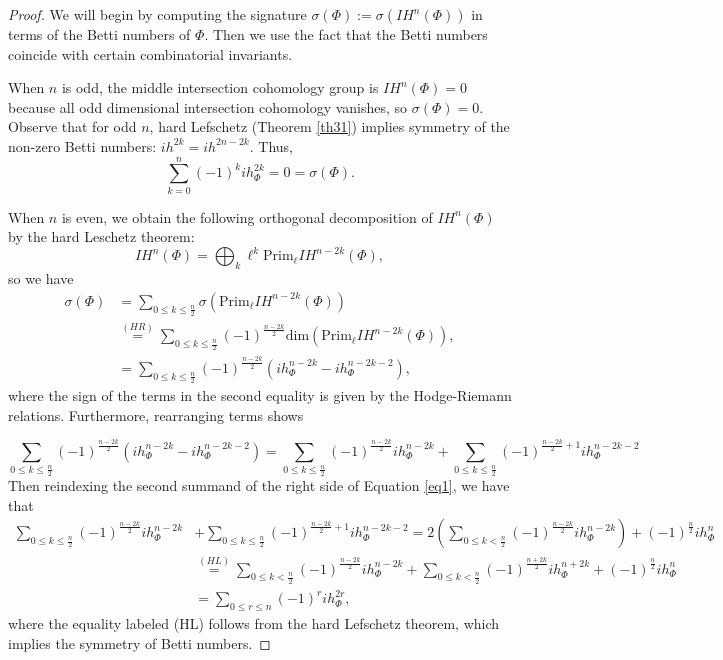 \documentclass[10pt,a4paper]{amsart}
\begin{document}
\begin{proof} We will begin by computing the signature $\sigma(\Phi):=\sigma(IH^n(\Phi))$ in terms of the Betti numbers of $\Phi$. Then we use the fact that the Betti numbers coincide with certain combinatorial invariants.

When $n$ is odd, the middle intersection cohomology group is $IH^n(\Phi)=0$ because all odd dimensional intersection cohomology vanishes, so $\sigma(\Phi)=0$. Observe that for odd $n$, hard Lefschetz (Theorem \ref{th31}) implies symmetry of the non-zero Betti numbers: $ih^{2k}=ih^{2n-2k}$. Thus, 
\begin{equation}\sum_{k=0}^n (-1)^kih_{\Phi}^{2k}=0=\sigma(\Phi).
\end{equation}

When $n$ is even, we obtain the following orthogonal decomposition of $IH^n(\Phi)$ by the hard Leschetz theorem:
\begin{equation}
   IH^n(\Phi)=\bigoplus_k \ell^{k}\text{Prim}_\ell IH^{n-2k}(\Phi), 
\end{equation}
so we have
\begin{equation}
\begin{split}
    \sigma(\Phi)&=\sum_{0\leq k\leq \frac{n}{2}}\sigma(\text{Prim}_\ell IH^{n-2k}(\Phi)) \\
   & \overset{(HR)}{=}\sum_{0\leq k\leq \frac{n}{2}}(-1)^\frac{n-2k}{2}\text{dim}(\text{Prim}_\ell IH^{n-2k}(\Phi)),\\
&=\sum_{0\leq k\leq \frac{n}{2}}(-1)^\frac{n-2k}{2}(ih_\Phi^{n-2k}-ih_\Phi^{n-2k-2}),
\end{split}
\end{equation}
where the sign of the terms in the second equality is given by the Hodge-Riemann relations. Furthermore, rearranging terms shows 

\begin{equation}\label{eq1}
    \sum_{0\leq k\leq \frac{n}{2}}(-1)^\frac{n-2k}{2}(ih_\Phi^{n-2k}-ih_\Phi^{n-2k-2})=\sum_{0\leq k\leq \frac{n}{2}}(-1)^\frac{n-2k}{2}ih_\Phi^{n-2k}+\sum_{0\leq k\leq \frac{n}{2}}(-1)^{\frac{n-2k}{2}+1}ih_\Phi^{n-2k-2}
\end{equation}
Then reindexing the second summand of the right side of Equation \ref{eq1}, we have that
\begin{equation*}
\begin{split}
    \sum_{0\leq k\leq \frac{n}{2}}(-1)^\frac{n-2k}{2}ih_\Phi^{n-2k}&+\sum_{0\leq k\leq \frac{n}{2}}(-1)^{\frac{n-2k}{2}+1}ih_\Phi^{n-2k-2}=2\left(\sum_{0\leq k< \frac{n}{2}}(-1)^\frac{n-2k}{2}ih_\Phi^{n-2k}\right)+(-1)^{\frac{n}{2}} ih_\Phi^n \\
&   \overset{(HL)}{=}\sum_{0\leq k< \frac{n}{2}}(-1)^\frac{n-2k}{2}ih_\Phi^{n-2k}+\sum_{0\leq k< \frac{n}{2}}(-1)^\frac{n+2k}{2}ih_\Phi^{n+2k}+(-1)^{\frac{n}{2}} ih_\Phi^n \\
&    =\sum_{0\leq r\leq n}(-1)^rih_\Phi^{2r},
\end{split}
\end{equation*}
where the equality labeled (HL) follows from the hard Lefschetz theorem, which implies the symmetry of Betti numbers.


\end{proof}
\end{document}
